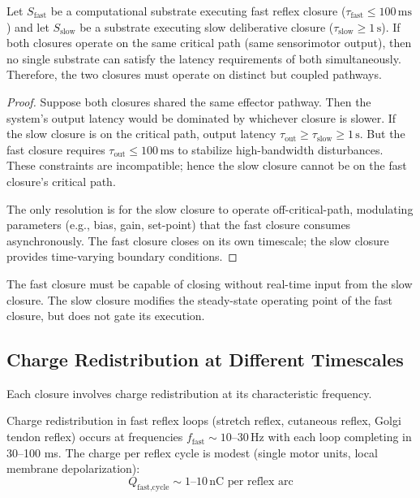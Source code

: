 \begin{theorem}
\label{thm:timescale-separation}
Let $S_{\text{fast}}$ be a computational substrate executing fast reflex closure ($\tau_{\text{fast}} \le 100\,\text{ms}$) and let $S_{\text{slow}}$ be a substrate executing slow deliberative closure ($\tau_{\text{slow}} \ge 1\,\text{s}$). If both closures operate on the same critical path (same sensorimotor output), then no single substrate can satisfy the latency requirements of both simultaneously. Therefore, the two closures must operate on distinct but coupled pathways.
\end{theorem}

\begin{proof}
Suppose both closures shared the same effector pathway. Then the system's output latency would be dominated by whichever closure is slower. If the slow closure is on the critical path, output latency $\tau_{\text{out}} \ge \tau_{\text{slow}} \ge 1\,\text{s}$. But the fast closure requires $\tau_{\text{out}} \le 100\,\text{ms}$ to stabilize high-bandwidth disturbances. These constraints are incompatible; hence the slow closure cannot be on the fast closure's critical path.

The only resolution is for the slow closure to operate off-critical-path, modulating parameters (e.g., bias, gain, set-point) that the fast closure consumes asynchronously. The fast closure closes on its own timescale; the slow closure provides time-varying boundary conditions.
\end{proof}

\begin{corollary}
The fast closure must be capable of closing without real-time input from the slow closure. The slow closure modifies the steady-state operating point of the fast closure, but does not gate its execution.
\end{corollary}

\subsection{Charge Redistribution at Different Timescales}

Each closure involves charge redistribution at its characteristic frequency.

\begin{definition}
Charge redistribution in fast reflex loops (stretch reflex, cutaneous reflex, Golgi tendon reflex) occurs at frequencies $f_{\text{fast}} \sim 10\text{--}30\,\text{Hz}$ with each loop completing in 30--100 ms. The charge per reflex cycle is modest (single motor units, local membrane depolarization):
\begin{equation}
Q_{\text{fast,cycle}} \sim 1\text{--}10\,\text{nC per reflex arc}
\end{equation}
\end{definition}

